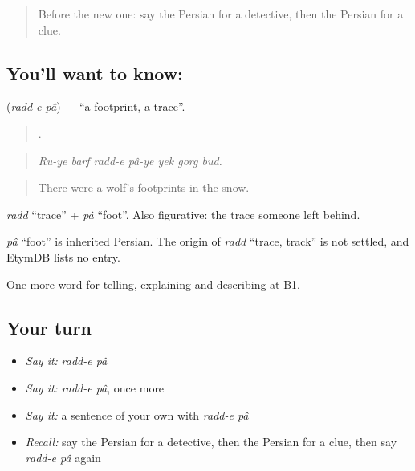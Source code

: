 \label{lesson:FA-C320-raddepa}



\begin{quote}
Before the new one: say the Persian for a detective, then the Persian for a clue.
\end{quote}

\subsection*{You'll want to know: }
\textbf{} (\emph{radd-e pâ}) — \textquotedblleft{}a footprint, a trace\textquotedblright{}.

\begin{quote}
     .
\end{quote}

\begin{quote}
\emph{Ru-ye barf radd-e pâ-ye yek gorg bud.}
\end{quote}

\begin{quote}
There were a wolf's footprints in the snow.
\end{quote}

\emph{radd} \textquotedblleft{}trace\textquotedblright{} + \emph{pâ} \textquotedblleft{}foot\textquotedblright{}. Also figurative: the trace someone left behind.

\begin{cousinweb}
\emph{pâ} \textquotedblleft{}foot\textquotedblright{} is inherited Persian. The origin of \emph{radd} \textquotedblleft{}trace, track\textquotedblright{} is not settled, and EtymDB lists no entry.
\end{cousinweb}

\begin{grammarlens}[title={What you've built}]
One more word for telling, explaining and describing at B1.
\end{grammarlens}

\subsection*{Your turn}
\begin{itemize}
\raggedright
  \item \emph{Say it:} \emph{radd-e pâ}
  \item \emph{Say it:} \emph{radd-e pâ}, once more
  \item \emph{Say it:} a sentence of your own with \emph{radd-e pâ}
  \item \emph{Recall:} say the Persian for a detective, then the Persian for a clue, then say \emph{radd-e pâ} again
\end{itemize}

